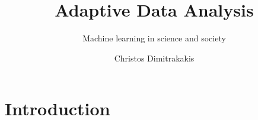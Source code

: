 \documentclass[9pt]{beamer}
\title{Adaptive Data Analysis}
\subtitle{Machine learning in science and society}
\author[C. Dimitrakakis]{Christos Dimitrakakis}
\begin{document}
\begin{frame}
  \titlepage
\end{frame}

\chapter{Introduction}

  




\end{document}
